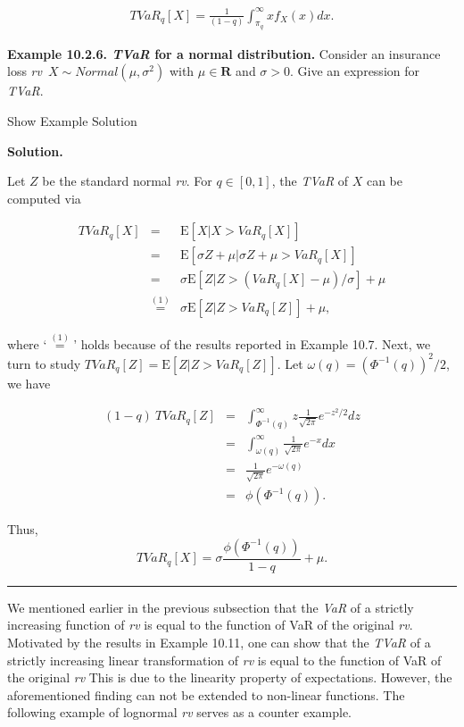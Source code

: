 \documentclass[]{book}
\theoremstyle{definition}
\theoremstyle{definition}
\theoremstyle{definition}
\theoremstyle{remark}
\begin{document}
\begin{eqnarray}
TVaR_{q}[X]=\frac{1}{(1-q)}\int_{\pi_q}^{\infty}xf_X(x)dx.
\label{eq:cte-pdf}
\end{eqnarray}

\textbf{Example 10.2.6. \emph{TVaR} for a normal distribution.} Consider
an insurance loss \emph{rv}~\(X\sim Normal (\mu,\sigma^2)\) with
\(\mu\in \mathbf{R}\) and \(\sigma>0\). Give an expression for
\emph{TVaR}.

Show Example Solution

\hypertarget{toggleExamplePortMgt.2.6}{}
\textbf{Solution.}

Let \(Z\) be the standard normal \emph{rv}. For \(q\in[0,1]\), the
\emph{TVaR} of \(X\) can be computed via

\begin{eqnarray*}
  TVaR_q[X] &=& \mathrm{E}[X|X>VaR_q[X]]\\
&=&\mathrm{E}[\sigma Z+\mu|\sigma Z+\mu>VaR_q[X]]\\
&=& \sigma\mathrm{E}[Z|Z>(VaR_q[X]-\mu)/\sigma]+\mu\\
&\overset{(1)}{=}& \sigma\mathrm{E}[Z|Z>VaR_q[Z]]+\mu,
\end{eqnarray*}

where `\(\overset{(1)}{=}\)' holds because of the results reported in
Example 10.7. Next, we turn to study
\(TVaR_q[Z]=\mathrm{E}[Z|Z>VaR_q[Z]]\). Let
\(\omega(q)=(\Phi^{-1}(q))^2/2\), we have

\begin{eqnarray*}
  (1-q)\ TVaR_q[Z] &=& \int_{\Phi^{-1}(q)}^{\infty} z \frac{1}{\sqrt{2\pi}} e^{-z^2/2}dz\\
&=& \int_{\omega(q)}^{\infty}  \frac{1}{\sqrt{2\pi}} e^{-x}dx\\
&=& \frac{1}{\sqrt{2\pi}} e^{-\omega(q)}\\
&=& \phi(\Phi^{-1}(q)).
\end{eqnarray*}

Thus, \[
TVaR_q[X]=\sigma\frac{\phi(\Phi^{-1}(q))}{1-q}+\mu.
\]

\begin{center}\rule{0.5\linewidth}{\linethickness}\end{center}

We mentioned earlier in the previous subsection that the \emph{VaR} of a
strictly increasing function of \emph{rv} is equal to the function of
VaR of the original \emph{rv}. Motivated by the results in Example
10.11, one can show that the \emph{TVaR} of a strictly increasing linear
transformation of \emph{rv} is equal to the function of VaR of the
original \emph{rv} This is due to the linearity property of
expectations. However, the aforementioned finding can not be extended to
non-linear functions. The following example of lognormal \emph{rv}
serves as a counter example.
\end{document}
